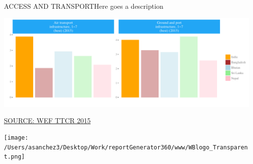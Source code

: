 \documentclass{article}\usepackage[]{graphicx}\usepackage[]{color}
\makeatletter
\def\maxwidth{ %
  \ifdim\Gin@nat@width>\linewidth
    \linewidth
  \else
    \Gin@nat@width
  \fi
}
\makeatother
\begin{document}
\begin{minipage}[c]{0.95\textwidth}
  \vspace{5ex}
  \begin{flushleft} 
    \hspace{4ex}\Large{\textcolor[HTML]{722FF5}{ACCESS AND TRANSPORT}}\hspace{2ex}\small{\textcolor[HTML]{818181}{Here goes a description}}
  \end{flushleft}
  \begin{minipage}[c]{0.99\textwidth}
    \hspace{4ex}\small{\textcolor[HTML]{818181}{}}
    \vspace{1ex}


{\centering \includegraphics[width=\maxwidth]{figure/bar_wrap5-1} 

}



  \hspace{4ex}\scriptsize{\href{NA}{\textcolor[HTML]{722FF5}{SOURCE: WEF TTCR 2015}}}
  \end{minipage}
\end{minipage}

  \vspace{4ex}
  \begin{minipage}[c]{0.33\textwidth}
    \hspace*{+0.3cm} \texttt{[image: /Users/asanchez3/Desktop/Work/reportGenerator360/www/WBlogo\_Transparent.png]}
  \end{minipage}
  \begin{minipage}[c]{0.60\textwidth}
    \vspace*{-0.1cm}
  \end{minipage}
\end{document}
